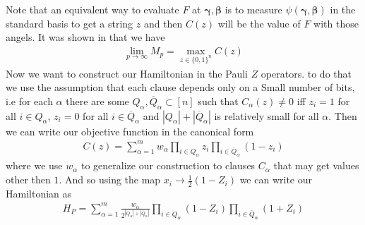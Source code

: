 \documentclass[12pt]{amsart}
\numberwithin{equation}{section}
\theoremstyle{definition}
\begin{document}
Note that an equivalent way to evaluate $F$ at $\pmb{\gamma},\pmb{\beta}$ is to measure $\psi(\pmb{\gamma},\pmb{\beta})$ in the standard basis to get a string $z$ and then $C(z)$ will be the value of $F$ with those angels. It was shown in \cite{QAOA} that we have \begin{align*}
    \lim_{p\to\infty}M_p=\max_{z\in\{0,1\}^n}C(z)
\end{align*}
Now we want to construct  our Hamiltonian in the Pauli $Z$ operators. to do that we use the assumption that each clause depends only on a Small number of bits, i.e for each $\alpha$ there are some $Q_\alpha, \overline{Q}_\alpha \subset [n]$ such that $C_\alpha(z)\neq0$ iff $z_i=1$ for all $i\in Q_\alpha$, $z_i=0$ for all $i\in \overline{Q}_\alpha$ and $|Q_\alpha|+|\overline{Q}_\alpha|$ is relatively small for all $\alpha$. Then we can
write our objective function in the canonical form \begin{align*}
    C(z)=\sum_{\alpha=1}^m w_{\alpha}\prod_{i\in Q_\alpha}z_i\prod_{i\in \overline{Q}_\alpha}(1-z_i)
\end{align*}
where we use $w_\alpha$ to generalize our construction to clauses $C_\alpha$ that may get values other then $1$.
And so using the map $x_i\to \frac{1}{2}(1-Z_i)$ we can write our Hamiltonian as \begin{align*}
    H_P=\sum_{\alpha=1}^m \frac{w_\alpha}{2^{|Q_\alpha|+|\overline{Q}_\alpha|}}\prod_{i\in Q_\alpha}(1-Z_i)\prod_{i\in \overline{Q}_\alpha}(1+Z_i)
\end{align*}
 
\end{document}
